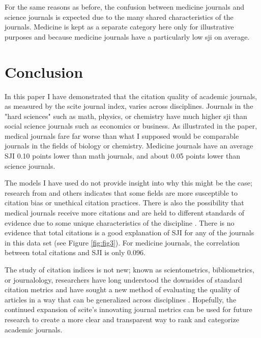 \documentclass[12pt,english]{article}
\begin{document}
For the same reasons as before, the confusion between medicine journals and science journals is expected due to the many shared characteristics of the journals. Medicine is kept as a separate category here only for illustrative purposes and because medicine journals have a particularly low sji on average.

\section{Conclusion}\label{sec:conclusion}

In this paper I have demonstrated that the citation quality of academic journals, as measured by the scite journal index, varies across disciplines. Journals in the "hard sciences" such as math, physics, or chemistry have much higher sji than social science journals such as economics or business. As illustrated in the paper, medical journals fare far worse than what I supposed would be comparable journals in the fields of biology or chemistry. Medicine journals have an average SJI 0.10 points lower than math journals, and about 0.05 points lower than science journals.

The models I have used do not provide insight into why this might be the case; research from \cite{duyx_scientific_2017} and others indicates that some fields are more susceptible to citation bias or unethical citation practices. There is also the possibility that medical journals receive more citations and are held to different standards of evidence due to some unique characteristics of the discipline \citep{patience_citation_2017}. There is no evidence that total citations is a good explanation of SJI for any of the journals in this data set (see Figure \ref{fig:fig3}). For medicine journals, the correlation between total citations and SJI is only 0.096. 

The study of citation indices is not new; known as scientometrics, bibliometrics, or journalology, researchers have long understood the downsides of standard citation metrics and have sought a new method of evaluating the quality of articles in a way that can be generalized across disciplines \citep{garfield_evolution_2007}. Hopefully, the continued expansion of scite's innovating journal metrics can be used for future research to create a more clear and transparent way to rank and categorize academic journals.

\vfill
\pagebreak{}
\begin{spacing}{1.0}

\end{spacing}
\end{document}
